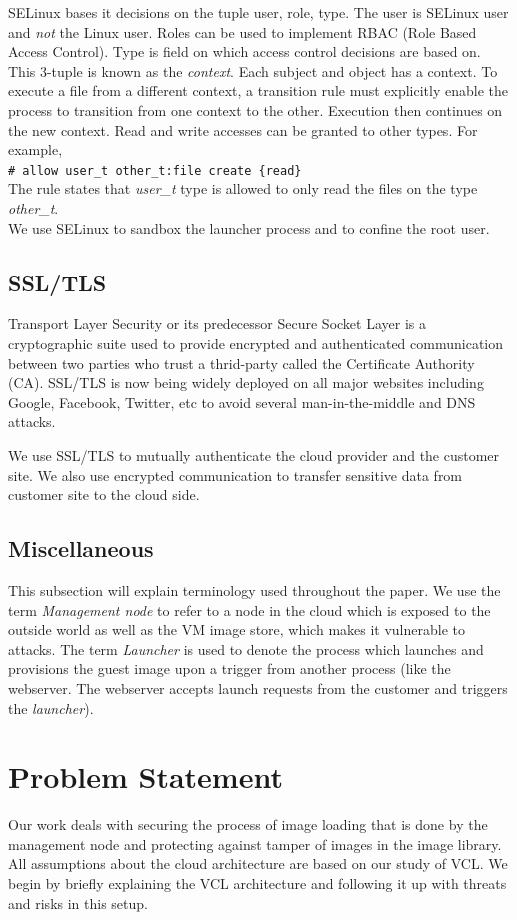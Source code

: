 \documentclass[10pt,twocolumn,pdftex]{article}
\begin{document}
SELinux bases it decisions on the tuple {user, role, type}. The user is SELinux user and \emph{not} the Linux user. Roles can be used to implement RBAC (Role Based Access Control). Type is field on which access control decisions are based on. This 3-tuple is known as the \emph{context}. Each subject and object has a context. To execute a file from a different context, a transition rule must explicitly enable the process to transition from one context to the other. Execution then continues on the new context. Read and write accesses can be granted to other types. For example,\\
{\tt \# allow user\_t other\_t:file create \{read\}} \\
The rule states that \emph{user\_t} type is allowed to only read the files on the type \emph{other\_t}.\\

We use SELinux to sandbox the launcher process and to confine the root user.

\subsection{SSL/TLS}
Transport Layer Security or its predecessor Secure Socket Layer is a cryptographic suite used to provide encrypted and authenticated communication between two parties who trust a thrid-party called the Certificate Authority (CA). SSL/TLS is now being widely deployed on all major websites including Google, Facebook, Twitter, etc to avoid several man-in-the-middle and DNS attacks. 

We use SSL/TLS to mutually authenticate the cloud provider and the customer site. We also use encrypted communication to transfer sensitive data from customer site to the cloud side.

\subsection{Miscellaneous}
This subsection will explain terminology used throughout the paper.
We use the term \emph{Management node} to refer to a node in the cloud which is exposed to the outside world as well as the VM image store, which makes it vulnerable to attacks. The term \emph{Launcher} is used to denote the process which launches and provisions the guest image upon a trigger from another process (like the webserver. The webserver accepts launch requests from the customer and triggers the \emph{launcher}). 

\section{Problem Statement}
Our work deals with securing the process of image loading that is done by the management node and protecting against tamper of images in the image library. All assumptions about the cloud architecture are based on our study of VCL. We begin by briefly explaining the VCL architecture and following it up with threats and risks in this setup.
\end{document}
